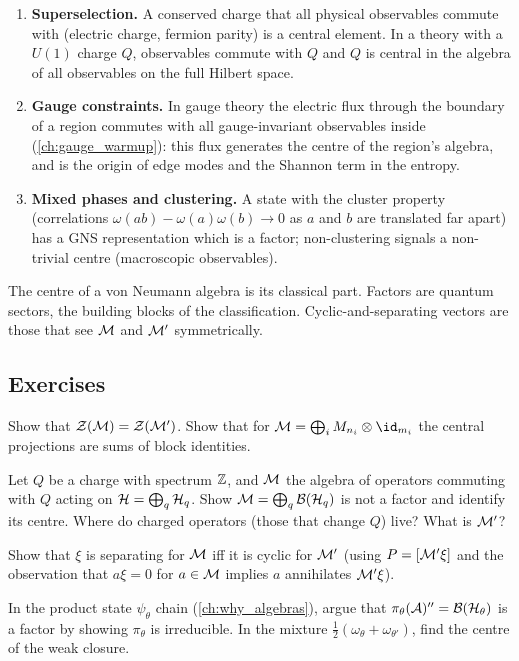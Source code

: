 \begin{enumerate}
\item \textbf{Superselection.} A conserved charge that all physical observables commute with (electric charge, fermion parity) is a central element. In a theory with a $U(1)$ charge $Q$, observables commute with $Q$ and $Q$ is central in the algebra of all observables on the full Hilbert space.
\item \textbf{Gauge constraints.} In gauge theory the electric flux through the boundary of a region commutes with all gauge-invariant observables inside (\cref{ch:gauge_warmup}): this flux generates the centre of the region's algebra, and is the origin of edge modes and the Shannon term in the entropy.
\item \textbf{Mixed phases and clustering.} A state with the cluster property (correlations $\omega(ab)-\omega(a)\omega(b)\to0$ as $a$ and $b$ are translated far apart) has a GNS representation which is a factor; non-clustering signals a non-trivial centre (macroscopic observables).
\end{enumerate}

\begin{keyidea}
The centre of a von Neumann algebra is its classical part. Factors are quantum sectors, the building blocks of the classification. Cyclic-and-separating vectors are those that see $\mathcal{M}$ and $\mathcal{M}'$ symmetrically.
\end{keyidea}

\subsection*{Exercises}
\begin{exercise}\label{ex:factors:1}
Show that $\mathcal{Z}(\mathcal{M})=\mathcal{Z}(\mathcal{M}')$. Show that for $\M=\bigoplus_iM_{n_i}\otimes\id_{m_i}$ the central projections are sums of block identities.
\end{exercise}
\begin{exercise}\label{ex:factors:2}
Let $Q$ be a charge with spectrum $\mathbb{Z}$, and $\mathcal{M}$ the algebra of operators commuting with $Q$ acting on $\mathcal{H}=\bigoplus_q\mathcal{H}_q$. Show $\mathcal{M}=\bigoplus_q\mathcal{B}(\mathcal{H}_q)$ is not a factor and identify its centre. Where do charged operators (those that change $Q$) live? What is $\mathcal{M}'$?
\end{exercise}
\begin{exercise}\label{ex:factors:3}
Show that $\xi$ is separating for $\mathcal{M}$ iff it is cyclic for $\mathcal{M}'$ (using $P=[\mathcal{M}'\xi]$ and the observation that $a\xi=0$ for $a\in\mathcal{M}$ implies $a$ annihilates $\mathcal{M}'\xi$).
\end{exercise}
\begin{exercise}\label{ex:factors:4}
In the product state $\psi_\theta$ chain (\cref{ch:why_algebras}), argue that $\pi_\theta(\mathcal{A})''=\mathcal{B}(\mathcal{H}_\theta)$ is a factor by showing $\pi_\theta$ is irreducible. In the mixture $\tfrac12(\omega_\theta+\omega_{\theta'})$, find the centre of the weak closure.
\end{exercise}

